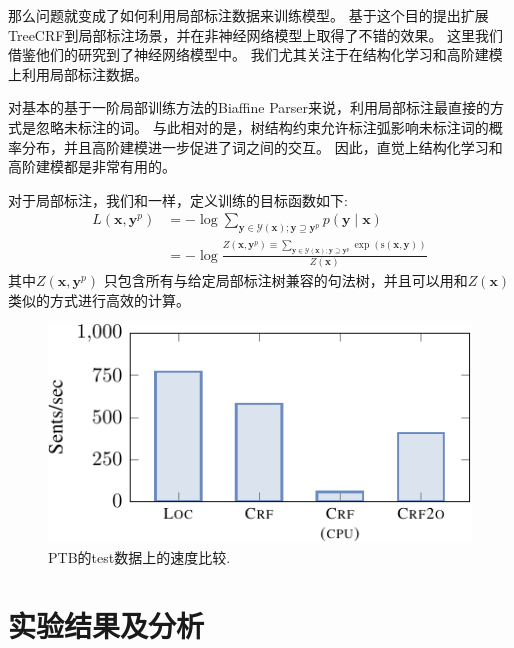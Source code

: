 那么问题就变成了如何利用局部标注数据来训练模型。
\citet{li-etal-2016-active}基于这个目的提出扩展TreeCRF到局部标注场景，并在非神经网络模型上取得了不错的效果。
这里我们借鉴他们的研究到了神经网络模型中。
我们尤其关注于在结构化学习和高阶建模上利用局部标注数据。

对基本的基于一阶局部训练方法的Biaffine Parser来说，利用局部标注最直接的方式是忽略未标注的词。
与此相对的是，树结构约束允许标注弧影响未标注词的概率分布，并且高阶建模进一步促进了词之间的交互。
因此，直觉上结构化学习和高阶建模都是非常有用的。

对于局部标注，我们和\citet{li-etal-2016-active}一样，定义训练的目标函数如下:
\begin{equation}
	\label{eq:training-loss-treecrf-partial}
	\begin{split}
		\mathit{L}(\boldsymbol{x}, {\boldsymbol{y}^p}) &= -\log \sum\limits_{\boldsymbol{y} \in \mathcal{Y}(\boldsymbol{x}); \boldsymbol{y} \supseteq {\boldsymbol{y}^p}} p(\boldsymbol{y}\mid\boldsymbol{x})  \\
		&= - \log \frac{Z(\boldsymbol{x}, {\boldsymbol{y}^p}) \equiv \sum\limits_{\boldsymbol{y} \in \mathcal{Y}(\boldsymbol{x}); \boldsymbol{y} \supseteq \boldsymbol{y}^p} \exp(\mathrm{s}(\boldsymbol{x},\boldsymbol{y}))}{Z(\boldsymbol{x})}
	\end{split}
\end{equation}
其中$Z(\boldsymbol{x}, {\boldsymbol{y}^p})$ 只包含所有与给定局部标注树兼容的句法树，并且可以用和$Z(\boldsymbol{x})$类似的方式进行高效的计算。

\begin{figure}[tb]
	\centering
	\includegraphics[scale=1.2]{figures/dep-speed.pdf}
	\caption{
		PTB的test数据上的速度比较.
	}
	\label{fig:speed}
\end{figure}

\section{实验结果及分析}\label{sec:dep-exps}

